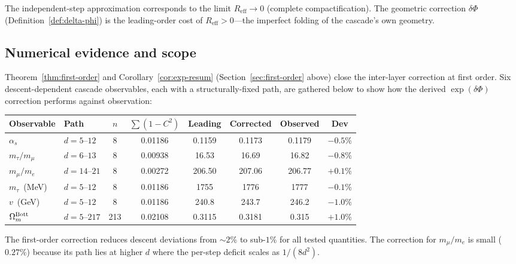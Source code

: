 \documentclass[12pt,a4paper]{article}
\theoremstyle{remark}
\begin{document}
The independent-step approximation corresponds to the limit $R_{\mathrm{eff}} \to 0$ (complete compactification). The geometric correction $\delta\Phi$ (Definition~\ref{def:delta-phi}) is the leading-order cost of $R_{\mathrm{eff}} > 0$---the imperfect folding of the cascade's own geometry.

\subsection{Numerical evidence and scope}

Theorem~\ref{thm:first-order} and Corollary~\ref{cor:exp-resum} (Section~\ref{sec:first-order} above) close the inter-layer correction at first order. Six descent-dependent cascade observables, each with a structurally-fixed path, are gathered below to show how the derived $\exp(\delta\Phi)$ correction performs against observation:

\begin{center}
\renewcommand{\arraystretch}{1.3}
\begin{tabular}{llcccccc}
\toprule
Observable & Path & $n$ & $\sum(1-C^2)$ & Leading & Corrected & Observed & Dev \\
\midrule
$\alpha_s$ & $d\!=\!5$--$12$ & 8 & 0.01186 & 0.1159 & 0.1173 & 0.1179 & $-0.5\%$ \\
$m_\tau/m_\mu$ & $d\!=\!6$--$13$ & 8 & 0.00938 & 16.53 & 16.69 & 16.82 & $-0.8\%$ \\
$m_\mu/m_e$ & $d\!=\!14$--$21$ & 8 & 0.00272 & 206.50 & 207.06 & 206.77 & $+0.1\%$ \\
$m_\tau$~(MeV) & $d\!=\!5$--$12$ & 8 & 0.01186 & 1755 & 1776 & 1777 & $-0.1\%$ \\
$v$~(GeV) & $d\!=\!5$--$12$ & 8 & 0.01186 & 240.8 & 243.7 & 246.2 & $-1.0\%$ \\
$\Omega_m^{\rm Bott}$ & $d\!=\!5$--$217$ & 213 & 0.02108 & 0.3115 & 0.3181 & 0.315 & $+1.0\%$ \\
\bottomrule
\end{tabular}
\end{center}

\noindent The first-order correction reduces descent deviations from $\sim\!2\%$ to sub-$1\%$ for all tested quantities. The correction for $m_\mu/m_e$ is small ($0.27\%$) because its path lies at higher $d$ where the per-step deficit scales as $1/(8d^2)$.
\end{document}
